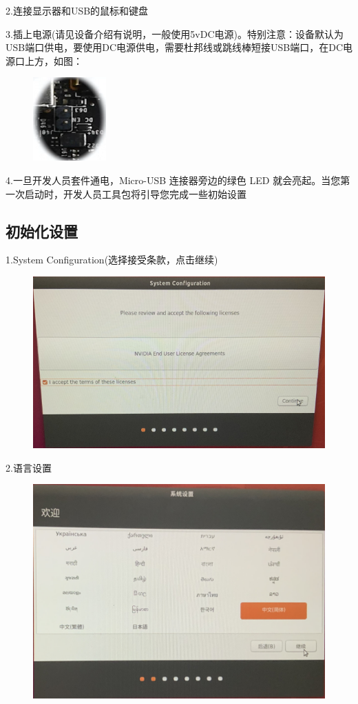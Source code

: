 \documentclass[openbib]{article}
\begin{document}
2.连接显示器和USB的鼠标和键盘

3.插上电源(请见设备介绍有说明，一般使用5vDC电源)。特别注意：设备默认为USB端口供电，要使用DC电源供电，需要杜邦线或跳线棒短接USB端口，在DC电源口上方，如图：
\begin{figure}[H]
	\centering
	\includegraphics[scale=0.3]{souce}
\end{figure}

4.一旦开发人员套件通电，Micro-USB 连接器旁边的绿色 LED 就会亮起。当您第一次启动时，开发人员工具包将引导您完成一些初始设置
\subsection{初始化设置}
1.System Configuration(选择接受条款，点击继续)
\begin{figure}[htbp]
	\centering
	\includegraphics[scale=0.3]{01}
\end{figure}

2.语言设置
\begin{figure}[H]
	\centering
	\includegraphics[scale=0.3]{02}
\end{figure}
\end{document}
